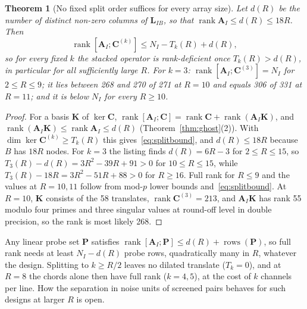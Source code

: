 \documentclass[11pt,a4paper]{article}
\newtheorem{theorem}{Theorem}[section]
\theoremstyle{definition}
\theoremstyle{remark}
\begin{document}
\begin{theorem}[No fixed split order suffices for every array size]\label{thm:splitscale}
Let $d(R)$ be the number of distinct non-zero columns of $\mathbf{L}_{IB}$, so that $\operatorname{rank}\mathbf{A}_I\le d(R)\le18R$. Then
\begin{equation}\label{eq:splitbound}
\operatorname{rank}[\mathbf{A}_I;\mathbf{C}^{(k)}]\le N_I-T_k(R)+d(R),
\end{equation}
so for every fixed $k$ the stacked operator is rank-deficient once $T_k(R)>d(R)$, in particular for all sufficiently large $R$. For $k = 3$: $\operatorname{rank}[\mathbf{A}_I;\mathbf{C}^{(3)}] = N_I$ for $2\le R\le9$; it lies between 268 and 270 of 271 at $R = 10$ and equals 306 of 331 at $R = 11$; and it is below $N_I$ for every $R\ge10$.
\end{theorem}
\begin{proof}
For a basis $\mathbf{K}$ of $\ker\mathbf{C}$, $\operatorname{rank}[\mathbf{A}_I;\mathbf{C}] = \operatorname{rank}\mathbf{C}+\operatorname{rank}(\mathbf{A}_I\mathbf{K})$, and $\operatorname{rank}(\mathbf{A}_I\mathbf{K})\le\operatorname{rank}\mathbf{A}_I\le d(R)$ (Theorem~\ref{thm:ghost}(2)). With $\dim\ker\mathbf{C}^{(k)}\ge T_k(R)$ this gives~\eqref{eq:splitbound}, and $d(R)\le18R$ because $B$ has $18R$ nodes. For $k = 3$ the listing finds $d(R) = 6R-3$ for $2\le R\le15$, so $T_3(R)-d(R) = 3R^2-39R+91>0$ for $10\le R\le15$, while $T_3(R)-18R = 3R^2-51R+88>0$ for $R\ge16$. Full rank for $R\le9$ and the values at $R = 10, 11$ follow from mod-$p$ lower bounds and~\eqref{eq:splitbound}. At $R = 10$, $\mathbf{K}$ consists of the 58 translates, $\operatorname{rank}\mathbf{C}^{(3)} = 213$, and $\mathbf{A}_I\mathbf{K}$ has rank 55 modulo four primes and three singular values at round-off level in double precision, so the rank is most likely 268.
\end{proof}
Any linear probe set $\mathbf{P}$ satisfies $\operatorname{rank}[\mathbf{A}_I;\mathbf{P}]\le d(R)+\operatorname{rows}(\mathbf{P})$, so full rank needs at least $N_I-d(R)$ probe rows, quadratically many in $R$, whatever the design. Splitting to $k\ge R/2$ leaves no dilated translate ($T_k = 0$), and at $R = 8$ the chords alone then have full rank ($k = 4, 5$), at the cost of $k$ channels per line. How the separation in noise units of screened pairs behaves for such designs at larger $R$ is open.
\end{document}
